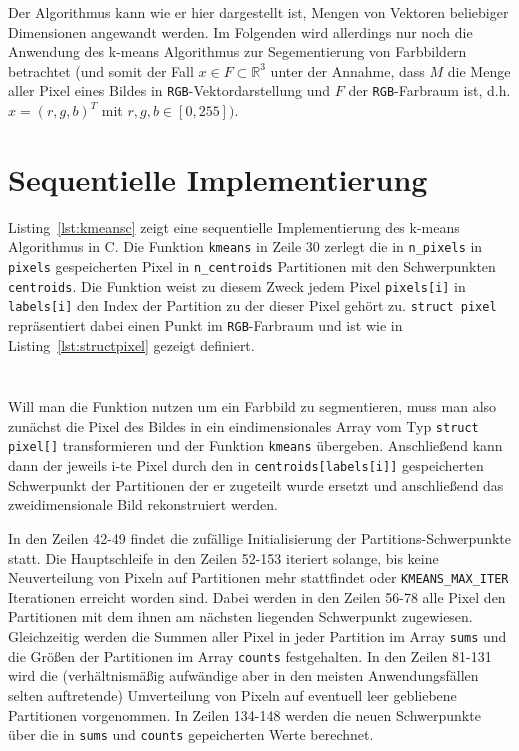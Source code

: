 \documentclass[
    bibliography=totoc, cd=lightcolor, cdmath=false, ngerman]{tudscrreprt}
\begin{document}
Der Algorithmus kann wie er hier dargestellt ist, Mengen von Vektoren beliebiger
Dimensionen angewandt werden. Im Folgenden wird allerdings nur noch die Anwendung
des k-means Algorithmus zur Segementierung von Farbbildern betrachtet (und
somit der Fall $x \in F \subset \mathbb{R}^3$ unter der Annahme, dass $M$ die
Menge aller Pixel eines Bildes in \texttt{RGB}-Vektordarstellung und $F$ der
\texttt{RGB}-Farbraum ist, d.h. $x = (r, g, b)^T$ mit $r, g, b \in [0,
255])$.

\section{Sequentielle Implementierung}

Listing~\ref{lst:kmeansc} zeigt eine sequentielle Implementierung des k-means
Algorithmus in C. Die Funktion \texttt{kmeans} in Zeile 30 zerlegt die in
\texttt{n\_pixels} in \texttt{pixels} gespeicherten Pixel in
\texttt{n\_centroids} Partitionen mit den Schwerpunkten \texttt{centroids}. Die
Funktion weist zu diesem Zweck jedem Pixel \texttt{pixels[i]} in
\texttt{labels[i]} den Index der Partition zu der dieser Pixel gehört zu.
\texttt{struct pixel} repräsentiert dabei einen Punkt im \texttt{RGB}-Farbraum
und ist wie in Listing~\ref{lst:structpixel} gezeigt definiert.

\inputminted[lastline=163, label=kmeansc]{C}{c/src/kmeans.c}

\inputminted[firstline=4, lastline=7]{C}{c/include/kmeans.h}

Will man die Funktion nutzen um ein Farbbild zu segmentieren, muss man also
zunächst die Pixel des Bildes in ein eindimensionales Array vom Typ
\texttt{struct pixel[]} transformieren und der Funktion \texttt{kmeans}
übergeben. Anschließend kann dann der jeweils i-te Pixel durch den in
\texttt{centroids[labels[i]]} gespeicherten Schwerpunkt der Partitionen der er
zugeteilt wurde ersetzt und anschließend das zweidimensionale Bild
rekonstruiert werden.

In den Zeilen 42-49 findet die zufällige Initialisierung der
Partitions-Schwerpunkte statt. Die Hauptschleife in den Zeilen 52-153 iteriert
solange, bis keine Neuverteilung von Pixeln auf Partitionen mehr stattfindet
oder \texttt{KMEANS\_MAX\_ITER} Iterationen erreicht worden sind. Dabei werden
in den Zeilen 56-78 alle Pixel den Partitionen mit dem ihnen am nächsten
liegenden Schwerpunkt zugewiesen. Gleichzeitig werden die Summen aller Pixel in
jeder Partition im Array \texttt{sums} und die Größen der Partitionen im Array
\texttt{counts} festgehalten. In den Zeilen 81-131 wird die (verhältnismäßig
aufwändige aber in den meisten Anwendungsfällen selten auftretende)
Umverteilung von Pixeln auf eventuell leer gebliebene Partitionen vorgenommen.
In Zeilen 134-148 werden die neuen Schwerpunkte über die in \texttt{sums} und
\texttt{counts} gepeicherten Werte berechnet.
\end{document}
